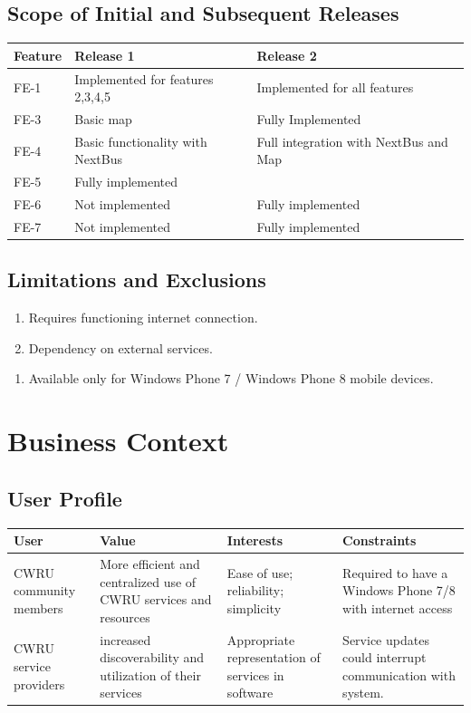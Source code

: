 \documentclass[pdftex,12pt,letter]{article}
\begin{document}
\subsection{Scope of Initial and Subsequent Releases}
\begin{table}[!h]
\begin{tabularx}{\textwidth }[t]{|l|Y|Y|}
\hline
\bfseries Feature & \bfseries\hspace{1cm}Release 1 & \bfseries\hspace{1cm}Release 2\\ \hline
FE-1 & Implemented for features 2,3,4,5 & Implemented for all features\\ \hline
FE-3 & Basic map & Fully Implemented\\ \hline
FE-4 & Basic functionality with NextBus & Full integration with NextBus and Map\\ \hline
FE-5 & Fully implemented & ~ \\ \hline
FE-6 & Not implemented & Fully implemented\\ \hline
FE-7 & Not implemented & Fully implemented\\ \hline
\end{tabularx}
\end{table}
\FloatBarrier
\subsection{Limitations and Exclusions}
\begin{enumerate}[L{I}-1:]
\item Requires functioning internet connection.
\item Dependency on external services.
\end{enumerate}
\begin{enumerate}[EX-1:]
\item Available only for Windows Phone 7 / Windows Phone 8 mobile devices.
\end{enumerate}
\section{Business Context}
\subsection{User Profile}
\begin{table}[h]
\begin{tabularx}{\textwidth}[t]{|Y|Y|Y|Y|}
\hline
\bfseries User & \bfseries Value & \bfseries Interests & \bfseries Constraints\\ \hline
CWRU community members & More efficient and centralized use of CWRU services and resources & Ease of use; reliability; simplicity & Required to have a Windows Phone 7/8 with internet access \\ \hline
CWRU service providers & increased discoverability and utilization of their services & Appropriate representation of services in software & Service updates could interrupt communication with system. \\ \hline
\end{tabularx}
\end{table}

\end{document}
